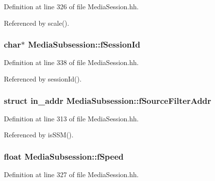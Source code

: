 Definition at line 326 of file Media\+Session.\+hh.



Referenced by scale().

\subsubsection[{f\+Session\+Id}]{\setlength{\rightskip}{0pt plus 5cm}char$\ast$ Media\+Subsession\+::f\+Session\+Id\hspace{0.3cm}{\ttfamily [protected]}}\label{classMediaSubsession_a6591af3d5fdee6088ad4b8410f150abd}


Definition at line 338 of file Media\+Session.\+hh.



Referenced by session\+Id().

\subsubsection[{f\+Source\+Filter\+Addr}]{\setlength{\rightskip}{0pt plus 5cm}struct in\+\_\+addr Media\+Subsession\+::f\+Source\+Filter\+Addr\hspace{0.3cm}{\ttfamily [protected]}}\label{classMediaSubsession_a169dc45b69b7420d08fb148afc70bcb1}


Definition at line 313 of file Media\+Session.\+hh.



Referenced by is\+S\+S\+M().

\subsubsection[{f\+Speed}]{\setlength{\rightskip}{0pt plus 5cm}float Media\+Subsession\+::f\+Speed\hspace{0.3cm}{\ttfamily [protected]}}\label{classMediaSubsession_a50691822a92029e8bd35d91445698619}


Definition at line 327 of file Media\+Session.\+hh.



